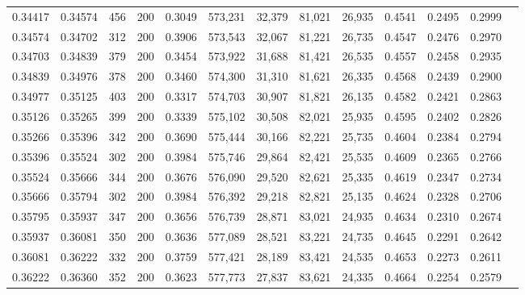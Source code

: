 \begin{tabular}{rrrrrrrrrrrrr}
0.34417 & 0.34574 &    456 & 200 &                                     0.3049 & 573,231 &  32,379 &  81,021 &  26,935 & 0.4541 & 0.2495 & 0.2999 \\
0.34574 & 0.34702 &    312 & 200 &                                     0.3906 & 573,543 &  32,067 &  81,221 &  26,735 & 0.4547 & 0.2476 & 0.2970 \\
0.34703 & 0.34839 &    379 & 200 &                                     0.3454 & 573,922 &  31,688 &  81,421 &  26,535 & 0.4557 & 0.2458 & 0.2935 \\
0.34839 & 0.34976 &    378 & 200 &                                     0.3460 & 574,300 &  31,310 &  81,621 &  26,335 & 0.4568 & 0.2439 & 0.2900 \\
0.34977 & 0.35125 &    403 & 200 &                                     0.3317 & 574,703 &  30,907 &  81,821 &  26,135 & 0.4582 & 0.2421 & 0.2863 \\
0.35126 & 0.35265 &    399 & 200 &                                     0.3339 & 575,102 &  30,508 &  82,021 &  25,935 & 0.4595 & 0.2402 & 0.2826 \\
0.35266 & 0.35396 &    342 & 200 &                                     0.3690 & 575,444 &  30,166 &  82,221 &  25,735 & 0.4604 & 0.2384 & 0.2794 \\
0.35396 & 0.35524 &    302 & 200 &                                     0.3984 & 575,746 &  29,864 &  82,421 &  25,535 & 0.4609 & 0.2365 & 0.2766 \\
0.35524 & 0.35666 &    344 & 200 &                                     0.3676 & 576,090 &  29,520 &  82,621 &  25,335 & 0.4619 & 0.2347 & 0.2734 \\
0.35666 & 0.35794 &    302 & 200 &                                     0.3984 & 576,392 &  29,218 &  82,821 &  25,135 & 0.4624 & 0.2328 & 0.2706 \\
0.35795 & 0.35937 &    347 & 200 &                                     0.3656 & 576,739 &  28,871 &  83,021 &  24,935 & 0.4634 & 0.2310 & 0.2674 \\
0.35937 & 0.36081 &    350 & 200 &                                     0.3636 & 577,089 &  28,521 &  83,221 &  24,735 & 0.4645 & 0.2291 & 0.2642 \\
0.36081 & 0.36222 &    332 & 200 &                                     0.3759 & 577,421 &  28,189 &  83,421 &  24,535 & 0.4653 & 0.2273 & 0.2611 \\
0.36222 & 0.36360 &    352 & 200 &                                     0.3623 & 577,773 &  27,837 &  83,621 &  24,335 & 0.4664 & 0.2254 & 0.2579 \\

\end{tabular}

